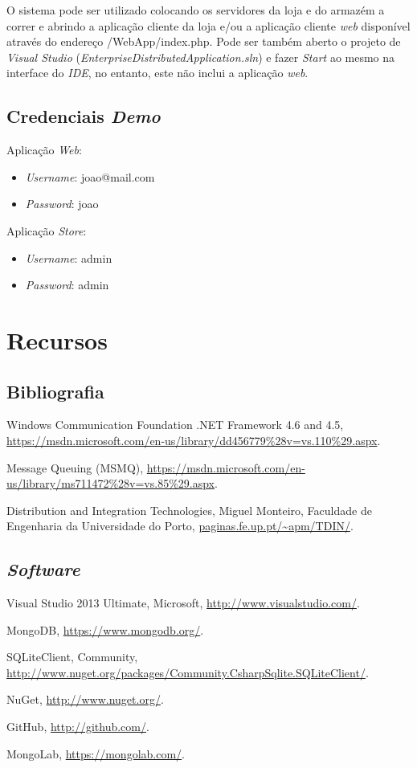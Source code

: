 \documentclass[12pt]{article}
\begin{document}
O sistema pode ser utilizado colocando os servidores da loja e do armazém a correr e abrindo a aplicação cliente da loja e/ou a aplicação cliente \textit{web} disponível através do endereço /WebApp/index.php. Pode ser também aberto o projeto de \textit{Visual Studio} (\textit{EnterpriseDistributedApplication.sln}) e fazer \textit{Start} ao mesmo na interface do \textit{IDE}, no entanto, este não inclui a aplicação \textit{web}.

\subsection*{Credenciais \textit{Demo}}

Aplicação \textit{Web}:
\begin{itemize}
\item \textit{Username}: joao@mail.com
\item \textit{Password}: joao
\end{itemize}

Aplicação \textit{Store}:
\begin{itemize}
\item \textit{Username}: admin
\item \textit{Password}: admin
\end{itemize}

\section{Recursos}

\subsection{Bibliografia}
\begin{description}
\item Windows Communication Foundation .NET Framework 4.6 and 4.5, \url{https://msdn.microsoft.com/en-us/library/dd456779\%28v=vs.110\%29.aspx}.
\item Message Queuing (MSMQ), \url{https://msdn.microsoft.com/en-us/library/ms711472\%28v=vs.85\%29.aspx}.
\item Distribution and Integration Technologies, Miguel Monteiro, Faculdade de Engenharia da Universidade do Porto, \url{paginas.fe.up.pt/~apm/TDIN/}.
\end{description}
\subsection{\it{Software}}
\begin{description}
\item Visual Studio 2013 Ultimate, Microsoft, \url{http://www.visualstudio.com/}.
\item MongoDB, \url{https://www.mongodb.org/}.
\item SQLiteClient, Community, \url{http://www.nuget.org/packages/Community.CsharpSqlite.SQLiteClient/}.
\item NuGet, \url{http://www.nuget.org/}.
\item GitHub, \url{http://github.com/}.
\item MongoLab, \url{https://mongolab.com/}.
\end{description}
\end{document}
